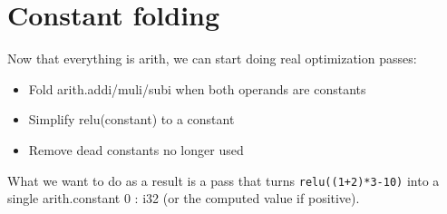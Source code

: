 \documentclass[../main.tex]{subfiles}
\begin{document}
\section{Constant folding}
Now that everything is arith, we can start doing real optimization passes:
\begin{itemize}
    \item Fold arith.addi/muli/subi when both operands are constants
    \item Simplify relu(constant) to a constant
    \item Remove dead constants no longer used
\end{itemize}

What we want to do as a result is a pass that turns \texttt{relu((1+2)*3-10)}
into a single arith.constant 0 : i32 (or the computed value if positive).
\end{document}
